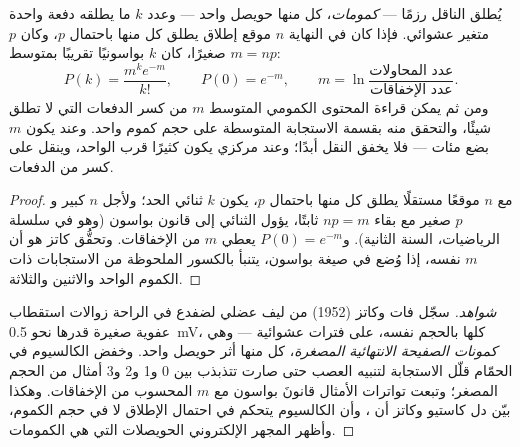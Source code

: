 \begin{theorem}\label{thm:b2:neurons-synapses:quantal}
يُطلق الناقل رزمًا --- \emph{كمومات}، كل منها حويصل
واحد --- وعدد $k$ ما يطلقه دفعة واحدة متغير
عشوائي. فإذا كان في النهاية $n$ موقع إطلاق يطلق كل منها
باحتمال $p$، وكان $p$ صغيرًا، كان $k$ بواسونيًا تقريبًا
بمتوسط $m = np$:
\[
P(k) = \frac{m^{k}e^{-m}}{k!}, \qquad P(0) = e^{-m}, \qquad
m = \ln\frac{\text{عدد المحاولات}}{\text{عدد الإخفاقات}}.
\]
ومن ثم يمكن قراءة المحتوى الكمومي المتوسط $m$ من
كسر الدفعات التي لا تطلق شيئًا، والتحقق منه بقسمة
الاستجابة المتوسطة على حجم كموم واحد. وعند
 يكون $m$ بضع مئات --- فلا يخفق النقل أبدًا؛
وعند  مركزي يكون كثيرًا قرب الواحد، وينقل 
على كسر من الدفعات.
\end{theorem}
\begin{proof}
مع $n$ موقعًا مستقلًا يطلق كل منها باحتمال $p$، يكون $k$
ثنائي الحد؛ ولأجل $n$ كبير و$p$ صغير مع بقاء $np = m$ ثابتًا،
يؤول الثنائي إلى قانون بواسون (وهو في سلسلة الرياضيات، السنة الثانية).
و$P(0) = e^{-m}$ يعطي $m$ من الإخفاقات. وتحقُّق كاتز هو أن
$m$ نفسه، إذا وُضع في صيغة بواسون، يتنبأ بالكسور الملحوظة
من الاستجابات ذات الكموم الواحد والاثنين والثلاثة.
\end{proof}
\begin{proof}[شواهد]
سجّل فات وكاتز (1952) من ليف عضلي لضفدع في الراحة
زوالات استقطاب عفوية صغيرة قدرها نحو \qty{0.5}{mV}، كلها
بالحجم نفسه، على فترات عشوائية --- وهي \emph{كمونات الصفيحة
الانتهائية المصغرة}، كل منها أثر حويصل واحد. وخفض الكالسيوم في
الحمّام قلّل الاستجابة لتنبيه العصب حتى صارت
تتذبذب بين 0 و1 و2 و3 أمثال من الحجم المصغر؛
وتبعت تواترات الأمثال قانونَ بواسون مع
$m$ المحسوب من الإخفاقات. وهكذا بيّن دل كاستيو وكاتز
أن ، وأن الكالسيوم يتحكم في احتمال
الإطلاق لا في حجم الكموم، وأظهر المجهر الإلكتروني
الحويصلات التي هي الكمومات.
\end{proof}

